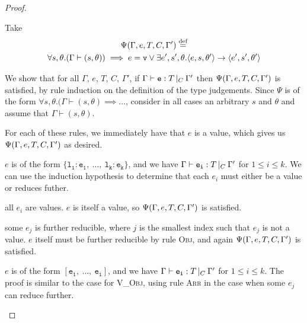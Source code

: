 \documentclass[a4paper]{article}
\theoremstyle{definition}
\theoremstyle{dotless}
\begin{document}
\begin{proof} \label{expProgressProof}

  Take 
  \begin{multline*}
  	\Psi(\Gamma, e, T, C, \Gamma') \stackrel{\text{def}}{=} \\
  	\forall s,\theta. (\Gamma \vdash (s,\theta))\implies e=\mathtt{v}\vee
  	\exists e', s',\theta. \langle{}e,s,\theta'\rangle{}\rightarrow{}\langle{}e',s',\theta'\rangle
  \end{multline*}

  We show that for all $\Gamma$, $e$, $T$, $C$, $\Gamma'$, if $\Gamma{}\vdash\mathtt{e}: T\,|_C\:\Gamma'$
  then $\Psi(\Gamma, e, T, C, \Gamma')$ is satisfied, by rule induction on the definition of the
  type judgements. Since $\Psi$ is of the form
  $\forall s,\theta.(\Gamma\vdash(s,\theta)\implies\dots$,
  consider in all cases an arbitrary $s$ and $\theta$ and assume that $\Gamma\vdash(s,\theta)$.

  \begin{case}\label{values} 

	For each of these rules, we immediately have that $e$ is a value, which
	gives us $\Psi(\Gamma, e, T, C, \Gamma'){}$ as desired.

  \end{case}

  \begin{case}[V\_Obj]\label{v_obj}

	$e$ is of the form $\mathtt{\{l_1: e_1,\ \dots,\ l_k: e_k\}}$, and we have $\Gamma{}\vdash\mathtt{e_i}: T\,|_C\:\Gamma'$ for $1 \leq i \leq k$.
	We can use the induction hypothesis to determine that each $e_i$ must
	either be a value or reduces futher.
	\begin{subcase}
	  all $e_i$ are values. 
	  $e$ is itself a value, so $\Psi(\Gamma, e, T, C, \Gamma')$ is
	  satisfied.
  	\end{subcase}
  	\begin{subcase}
  	  some $e_j$ is further reducible,
  	  where $j$ is the smallest index such
  	  that $e_j$ is not a value. $e$ itself must be further reducible by
  	  rule \textsc{Obj}, and again $\Psi(\Gamma, e, T, C, \Gamma')$ is satisfied.
	\end{subcase}
  \end{case}

  \begin{case}[V\_Arr]\label{v_arr}

	$e$ is of the form $\mathtt{[e_1,\ \dots,\ e_i]}$, and we have $\Gamma{}\vdash\mathtt{e_i}: T\,|_C\:\Gamma'$ for $1 \leq i \leq k$.
	The proof is similar to the case for \textsc{V\_Obj}, using rule
	\textsc{Arr} in the case when some $e_j$ can reduce further.


\end{case}
\end{proof}
\end{document}
